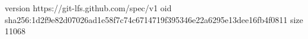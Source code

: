 version https://git-lfs.github.com/spec/v1
oid sha256:1d2f9e82d07026ad1e58f7c74c6714719f395346e22a6295e13dee16fb4f0811
size 11068
